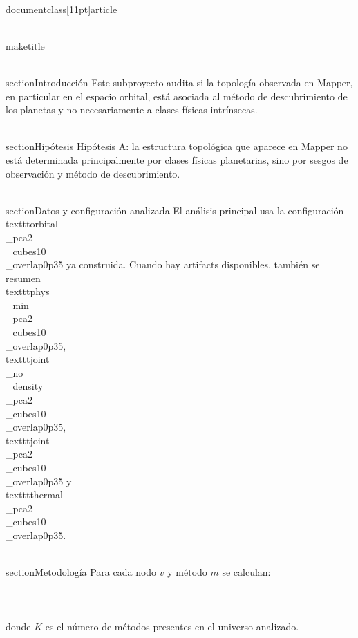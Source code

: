 \\documentclass[11pt]{article}
\begin{document}
\\maketitle

\\section{Introducci\'on}
Este subproyecto audita si la topolog\'ia observada en Mapper, en particular en el espacio orbital, est\'a asociada al m\'etodo de descubrimiento de los planetas y no necesariamente a clases f\'isicas intr\'insecas.

\\section{Hip\'otesis}
Hip\'otesis A: la estructura topol\'ogica que aparece en Mapper no est\'a determinada principalmente por clases f\'isicas planetarias, sino por sesgos de observaci\'on y m\'etodo de descubrimiento.

\\section{Datos y configuraci\'on analizada}
El an\'alisis principal usa la configuraci\'on \\texttt{orbital\\_pca2\\_cubes10\\_overlap0p35} ya construida. Cuando hay artifacts disponibles, tambi\'en se resumen \\texttt{phys\\_min\\_pca2\\_cubes10\\_overlap0p35}, \\texttt{joint\\_no\\_density\\_pca2\\_cubes10\\_overlap0p35}, \\texttt{joint\\_pca2\\_cubes10\\_overlap0p35} y \\texttt{thermal\\_pca2\\_cubes10\\_overlap0p35}.

\\section{Metodolog\'ia}
Para cada nodo $v$ y m\'etodo $m$ se calculan:
\\[
p_v(m) = \\frac{\\mathrm{count}_v(m)}{n_v}
\\]
\\[
\\mathrm{purity}(v) = \\max_m p_v(m)
\\]
\\[
H(v) = -\\sum_m p_v(m) \\log p_v(m)
\\]
\\[
H_{norm}(v) = \\frac{H(v)}{\\log(K)}
\\]
donde $K$ es el n\'umero de m\'etodos presentes en el universo analizado.
\end{document}
